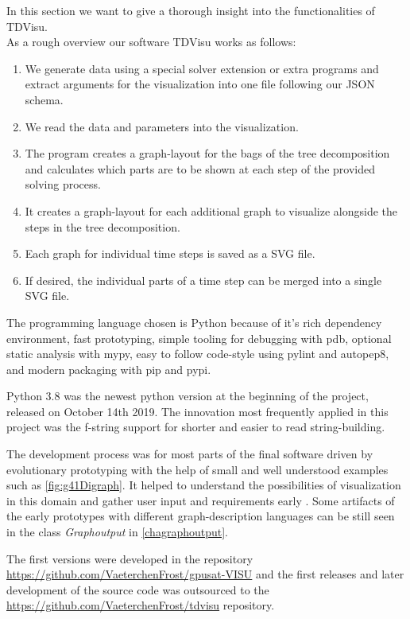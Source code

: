 \documentclass[a4paper, 12pt, bibliography=totoc]{scrartcl}
\begin{document}
In this section we want to give a thorough insight into the functionalities of TDVisu.\\

\noindent As a rough overview our software TDVisu works as follows:

\begin{enumerate}
	\item We generate data using a special solver extension or extra programs and extract arguments for the visualization into one file following our JSON schema.
	\item We read the data and parameters into the visualization.
	\item The program creates a graph-layout for the bags of the tree decomposition and calculates which parts are to be shown at each step of the provided solving process.
	\item It creates a graph-layout for each additional graph to visualize alongside the steps in the tree decomposition.
	\item Each graph for individual time steps is saved as a SVG file.
	\item If desired, the individual parts of a time step can be merged into a single SVG file.
\end{enumerate}

The programming language chosen is Python because of it's rich dependency environment, fast prototyping, simple tooling for debugging with pdb, optional static analysis with mypy, easy to follow code-style using pylint and autopep8, and modern packaging with pip and pypi.

Python 3.8 was the newest python version at the beginning of the project, released on October 14th 2019. The innovation most frequently applied in this project was the f-string support for shorter and easier to read string-building. %

The development process was for most parts of the final software driven by evolutionary prototyping with the help of small and well understood examples such as \ref{fig:g41Digraph}. It helped to understand the possibilities of visualization in this domain and gather user input and requirements early \cite{rapidPrototypingOvermyer}. Some artifacts of the early prototypes with different graph-description languages can be still seen in the class \textit{Graphoutput} in \ref{chagraphoutput}.

The first versions were developed in the repository \url{https://github.com/VaeterchenFrost/gpusat-VISU} and the first releases and later development of the source code was outsourced to the \url{https://github.com/VaeterchenFrost/tdvisu} repository.
\end{document}
